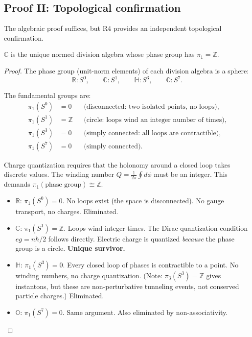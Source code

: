 \subsection{Proof II: Topological confirmation}

The algebraic proof suffices, but R4 provides an independent topological confirmation.

\begin{theorem}
\label{thm:C_topology}
$\mathbb{C}$ is the unique normed division algebra whose phase group has $\pi_1 = \mathbb{Z}$.
\end{theorem}

\begin{proof}
The phase group (unit-norm elements) of each division algebra is a sphere:
\begin{equation}
\mathbb{R}: S^0, \qquad \mathbb{C}: S^1, \qquad \mathbb{H}: S^3, \qquad \mathbb{O}: S^7.
\end{equation}

The fundamental groups are:
\begin{align}
\pi_1(S^0) &= 0 &&\text{(disconnected: two isolated points, no loops)}, \\
\pi_1(S^1) &= \mathbb{Z} &&\text{(circle: loops wind an integer number of times)}, \\
\pi_1(S^3) &= 0 &&\text{(simply connected: all loops are contractible)}, \\
\pi_1(S^7) &= 0 &&\text{(simply connected)}.
\end{align}

Charge quantization requires that the holonomy around a closed loop takes discrete values. The winding number $Q = \frac{1}{2\pi}\oint d\phi$ must be an integer. This demands $\pi_1(\text{phase group}) \cong \mathbb{Z}$.

\begin{itemize}
\item \textbf{$\mathbb{R}$}: $\pi_1(S^0) = 0$. No loops exist (the space is disconnected). No gauge transport, no charges. Eliminated.
\item \textbf{$\mathbb{C}$}: $\pi_1(S^1) = \mathbb{Z}$. Loops wind integer times. The Dirac quantization condition $eg = n\hbar/2$ follows directly. Electric charge is quantized \emph{because} the phase group is a circle. \textbf{Unique survivor.}
\item \textbf{$\mathbb{H}$}: $\pi_1(S^3) = 0$. Every closed loop of phases is contractible to a point. No winding numbers, no charge quantization. (Note: $\pi_3(S^3) = \mathbb{Z}$ gives instantons, but these are non-perturbative tunneling events, not conserved particle charges.) Eliminated.
\item \textbf{$\mathbb{O}$}: $\pi_1(S^7) = 0$. Same argument. Also eliminated by non-associativity. \qedhere
\end{itemize}
\end{proof}

